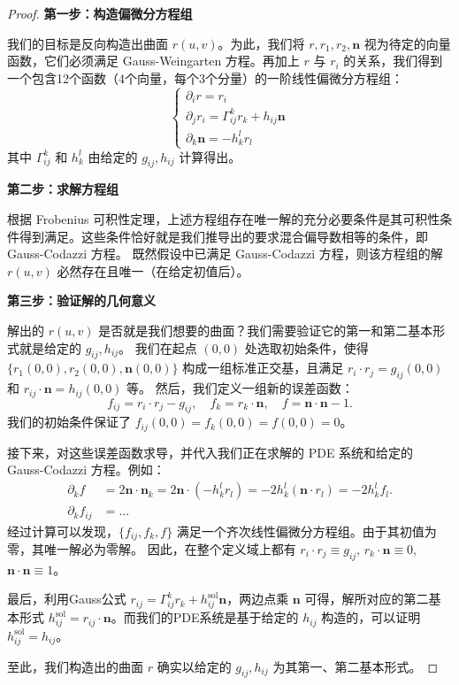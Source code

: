 \documentclass[lang=cn,10pt,thmcnt=section]{elegantbook}
\renewcommand{\vec}[1]{\mathbf{#1}}
\begin{document}
\begin{proof}

    \textbf{第一步：构造偏微分方程组}
    
    我们的目标是反向构造出曲面 $r(u,v)$。为此，我们将 $r, r_1, r_2, \vec{n}$ 视为待定的向量函数，它们必须满足 Gauss-Weingarten 方程。再加上 $r$ 与 $r_i$ 的关系，我们得到一个包含12个函数（4个向量，每个3个分量）的一阶线性偏微分方程组：
    \[
    \begin{cases}
    \partial_i r = r_i \\
    \partial_j r_i = \Gamma_{ij}^k r_k + h_{ij} \vec{n} \\
    \partial_k \vec{n} = -h_k^l r_l
    \end{cases}
    \]
    其中 $\Gamma_{ij}^k$ 和 $h_k^l$ 由给定的 $g_{ij}, h_{ij}$ 计算得出。

    \textbf{第二步：求解方程组}
    
    根据 Frobenius 可积性定理，上述方程组存在唯一解的充分必要条件是其可积性条件得到满足。这些条件恰好就是我们推导出的要求混合偏导数相等的条件，即 Gauss-Codazzi 方程。
    既然假设中已满足 Gauss-Codazzi 方程，则该方程组的解 $r(u,v)$ 必然存在且唯一（在给定初值后）。
    
    \textbf{第三步：验证解的几何意义}
    
    解出的 $r(u,v)$ 是否就是我们想要的曲面？我们需要验证它的第一和第二基本形式就是给定的 $g_{ij}, h_{ij}$。
    我们在起点 $(0,0)$ 处选取初始条件，使得 $\{r_1(0,0), r_2(0,0), \vec{n}(0,0)\}$ 构成一组标准正交基，且满足 $r_i \cdot r_j = g_{ij}(0,0)$ 和 $r_{ij} \cdot \vec{n} = h_{ij}(0,0)$ 等。
    然后，我们定义一组新的误差函数：
    \[
    f_{ij} = r_i \cdot r_j - g_{ij}, \quad f_k = r_k \cdot \vec{n}, \quad f = \vec{n} \cdot \vec{n} - 1.
    \]
    我们的初始条件保证了 $f_{ij}(0,0) = f_k(0,0) = f(0,0) = 0$。
    
    接下来，对这些误差函数求导，并代入我们正在求解的 PDE 系统和给定的 Gauss-Codazzi 方程。例如：
    \begin{align*}
        \partial_k f &= 2\vec{n} \cdot \vec{n}_k = 2\vec{n} \cdot (-h_k^l r_l) = -2h_k^l(\vec{n} \cdot r_l) = -2h_k^l f_l. \\
        \partial_k f_{ij} &= \dots
    \end{align*}
    经过计算可以发现，$\{f_{ij}, f_k, f\}$ 满足一个齐次线性偏微分方程组。由于其初值为零，其唯一解必为零解。
    因此，在整个定义域上都有 $r_i \cdot r_j \equiv g_{ij}$, $r_k \cdot \vec{n} \equiv 0$, $\vec{n} \cdot \vec{n} \equiv 1$。
    
    最后，利用Gauss公式 $r_{ij} = \Gamma_{ij}^k r_k + h_{ij}^{\text{sol}} \vec{n}$，两边点乘 $\vec{n}$ 可得，解所对应的第二基本形式 $h_{ij}^{\text{sol}} = r_{ij} \cdot \vec{n}$。而我们的PDE系统是基于给定的 $h_{ij}$ 构造的，可以证明 $h_{ij}^{\text{sol}} = h_{ij}$。
    
    至此，我们构造出的曲面 $r$ 确实以给定的 $g_{ij}, h_{ij}$ 为其第一、第二基本形式。
\end{proof}
\end{document}
